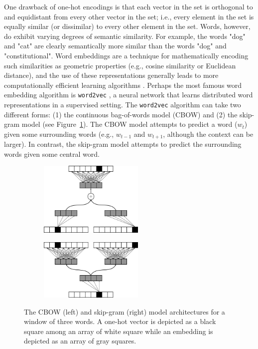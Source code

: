 \documentclass{article}
\begin{document}
One drawback of one-hot encodings is that each vector in the set is orthogonal to and equidistant from every other vector in the set; i.e., every element in the set is equally similar (or dissimilar) to every other element in the set. Words, however, do exhibit varying degrees of semantic similarity. For example, the words "dog" and "cat" are clearly semantically more similar than the words "dog" and "constitutional". Word embeddings are a technique for mathematically encoding such similarities as geometric properties (e.g., cosine similarity or Euclidean distance), and the use of these representations generally leads to more computationally efficient learning algorithms \parencite{Bengio2003}. Perhaps the most famous word embedding algorithm is \texttt{word2vec} \parencite{Mikolov2013}, a neural network that learns distributed word representations in a supervised setting. The \texttt{word2vec} algorithm can take two different forms: (1) the continuous bag-of-words model (CBOW) and (2) the skip-gram model (see Figure~\ref{fig:word2vec}). The CBOW model attempts to predict a word ($w_t$) given some surrounding words (e.g., $w_{t-1}$ and $w_{t+1}$, although the context can be larger). In contrast, the skip-gram model attempts to predict the surrounding words given some central word.

\begin{figure}[h]
\captionsetup[subfigure]{labelformat=empty}
\centering

    \begin{subfigure}[t]{0.45\textwidth}
    \centering
    \includegraphics[width=5cm]{cbow_fig.png}
    \caption{}
    \end{subfigure}%
    \begin{subfigure}[t]{0.45\textwidth}
    \centering
    \includegraphics[width=5cm]{skip_gram.png}
    \caption{}
    \end{subfigure}

\caption{The CBOW (left) and skip-gram (right) model architectures for a window of three words. A one-hot vector is depicted as a black square among an array of white square while an embedding is depicted as an array of gray squares.}
\label{fig:word2vec}
\end{figure}
\end{document}
